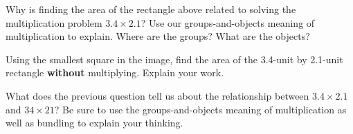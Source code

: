 \documentclass[nooutcomes,noauthor,handout]{ximera}
\begin{document}
\begin{problem}
Why is finding the area of the rectangle above related to solving the multiplication problem $3.4 \times 2.1$? Use our groups-and-objects meaning of multiplication to explain. Where are the groups? What are the objects?
\end{problem}

\begin{problem}
Using the smallest square in the image, find the area of the 3.4-unit by 2.1-unit rectangle {\bf without} multiplying. Explain your work.

\begin{image}
\end{image}
\end{problem}

\begin{problem}
What does the previous question tell us about the relationship between $3.4 \times 2.1$ and $34 \times 21$? Be sure to use the groups-and-objects meaning of multiplication as well as bundling to explain your thinking.
\end{problem}


\newpage
\end{document}
